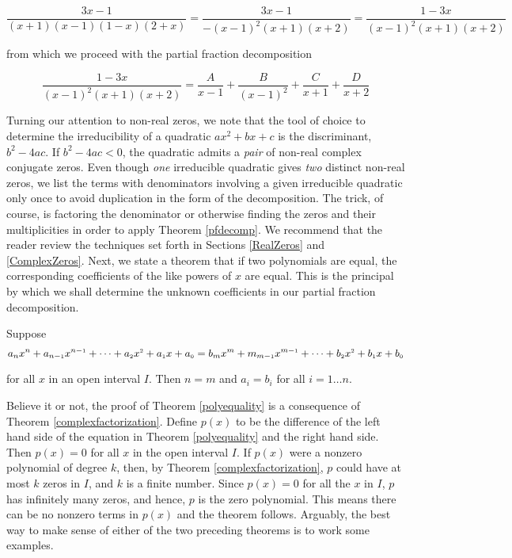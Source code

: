 \[\dfrac{3x-1}{(x+1)(x-1)(1-x)(2+x)} = \dfrac{3x-1}{-(x-1)^2(x+1)(x+2)} = \dfrac{1-3x}{(x-1)^2(x+1)(x+2)}\]

from which we proceed with the partial fraction decomposition

\[\dfrac{1-3x}{(x-1)^2(x+1)(x+2)} = \dfrac{A}{x-1} + \dfrac{B}{(x-1)^2} + \dfrac{C}{x+1} + \dfrac{D}{x+2}\]

Turning our attention to non-real zeros, we note that the tool of choice to determine the irreducibility of a quadratic  $ax^2+bx+c$ is the discriminant, $b^2-4ac$.  If $b^2 - 4ac < 0$, the quadratic admits a \textit{pair} of non-real complex conjugate zeros.  Even though \textit{one} irreducible quadratic gives \textit{two} distinct non-real zeros, we list the terms with denominators involving a given irreducible quadratic only once to avoid duplication in the form of the decomposition.  The trick, of course, is factoring the denominator or otherwise finding the zeros and their multiplicities in order to apply Theorem \ref{pfdecomp}.  We recommend that the reader review the techniques set forth in Sections \ref{RealZeros} and \ref{ComplexZeros}. Next, we state a theorem that if two polynomials are equal, the corresponding coefficients of the like powers of $x$ are equal.  This is the principal by which we shall determine the unknown coefficients in our partial fraction decomposition.

\smallskip

\colorbox{ResultColor}{\bbm

\begin{thm}  \label{polyequality} Suppose \[a_{n} x^{n} + a_{n-\mbox{\tiny$1$}} x^{n-\mbox{\tiny$1$}} + \cdots + a_{\mbox{\tiny $2$}} x^{\mbox{\tiny $2$}} + a_{\mbox{\tiny $1$}} x + a_{\mbox{\tiny $0$}} = b_{m} x^{m} + m_{m-\mbox{\tiny$1$}} x^{m-\mbox{\tiny$1$}} + \cdots + b_{\mbox{\tiny $2$}} x^{\mbox{\tiny $2$}} + b_{\mbox{\tiny $1$}} x + b_{\mbox{\tiny $0$}}\]

for all $x$ in an open interval $I$.  Then $n=m$ and $a_{i} = b_{i}$ for all $i = 1 \ldots n$.


\end{thm}

\ebm}


\smallskip

Believe it or not, the proof of Theorem \ref{polyequality} is a consequence of Theorem \ref{complexfactorization}.  Define $p(x)$ to be the difference of the left hand side of the equation in Theorem \ref{polyequality} and the right hand side.  Then $p(x) = 0$ for all $x$ in the open interval $I$.  If $p(x)$ were a nonzero polynomial of degree $k$, then, by Theorem \ref{complexfactorization}, $p$ could have at most $k$ zeros in $I$, and $k$ is a finite number.  Since $p(x) = 0$ for all the $x$ in $I$, $p$ has infinitely many zeros, and hence, $p$ is the zero polynomial.  This means there can be no nonzero terms in $p(x)$ and the theorem follows.  Arguably, the best way to make sense of either of the two preceding theorems is to work some examples.  

